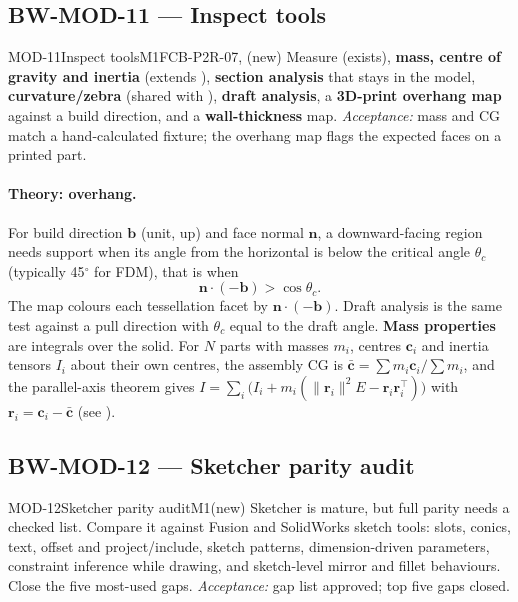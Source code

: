 \subsection{BW-MOD-11 --- Inspect tools}

\begin{epic}{MOD-11}{Inspect tools}{M1}{\stTodo}{FCB-P2R-07, (new)}
Measure (exists), \textbf{mass, centre of gravity and inertia} (extends ), \textbf{section
analysis} that stays in the model, \textbf{curvature/zebra} (shared with ), \textbf{draft
analysis}, a \textbf{3D-print overhang map} against a build direction, and a \textbf{wall-thickness} map.
\emph{Acceptance:} mass and CG match a hand-calculated fixture; the overhang map flags the expected faces on a
printed part.
\end{epic}

\paragraph{Theory: overhang.} For build direction $\mathbf b$ (unit, up) and face normal $\mathbf n$, a
downward-facing region needs support when its angle from the horizontal is below the critical angle
$\theta_c$ (typically 45$^\circ$ for FDM), that is when
\[
  \mathbf n\cdot(-\mathbf b) > \cos\theta_c .
\]
The map colours each tessellation facet by $\mathbf n\cdot(-\mathbf b)$. Draft analysis is the same test
against a pull direction with $\theta_c$ equal to the draft angle. \textbf{Mass properties} are integrals
over the solid. For $N$ parts with masses $m_i$, centres $\mathbf c_i$ and inertia tensors $I_i$ about their
own centres, the assembly CG is $\bar{\mathbf c}=\sum m_i\mathbf c_i/\sum m_i$, and the parallel-axis theorem
gives $I=\sum_i\big(I_i+m_i(\lVert\mathbf r_i\rVert^2E-\mathbf r_i\mathbf r_i^{\!\top})\big)$ with
$\mathbf r_i=\mathbf c_i-\bar{\mathbf c}$ (see ).

\subsection{BW-MOD-12 --- Sketcher parity audit}

\begin{epic}{MOD-12}{Sketcher parity audit}{M1}{\stTodo}{(new)}
Sketcher is mature, but full parity needs a checked list. Compare it against Fusion and SolidWorks sketch tools:
slots, conics, text, offset and project/include, sketch patterns, dimension-driven parameters, constraint
inference while drawing, and sketch-level mirror and fillet behaviours. Close the five most-used gaps.
\emph{Acceptance:} gap list approved; top five gaps closed.
\end{epic}
